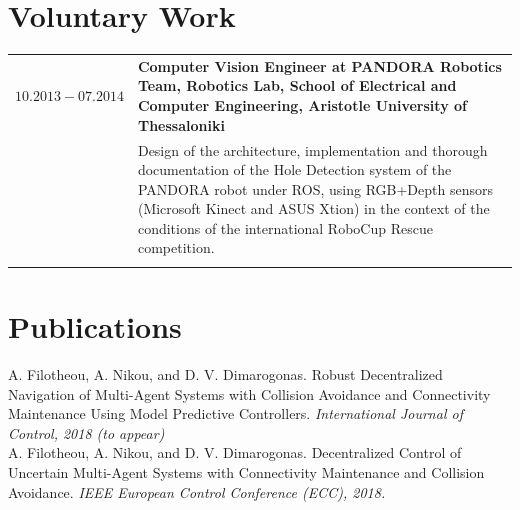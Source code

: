 \documentclass[a4paper,10pt,twoside]{article}
\begin{document}
\section{Voluntary Work}


\begin{tabular}{rp{11cm}}
$10.2013 -07.2014$ & \textbf{Computer Vision Engineer at PANDORA Robotics Team, Robotics Lab,
School of Electrical and Computer Engineering, Aristotle University of Thessaloniki} \\
& \small{Design of the architecture, implementation and thorough documentation of
the Hole Detection system of the PANDORA robot under ROS, using RGB+Depth sensors
(Microsoft Kinect and ASUS Xtion) in the context of the conditions of the international
RoboCup Rescue competition.}\\
\multicolumn{2}{c}{} \\
\end{tabular}


\section{Publications}

A. Filotheou, A. Nikou, and D. V. Dimarogonas. Robust Decentralized Navigation
of Multi-Agent Systems with Collision Avoidance and Connectivity Maintenance
Using Model Predictive Controllers. \textit{International Journal of Control, 2018 (to appear)}\\

A. Filotheou, A. Nikou, and D. V. Dimarogonas. Decentralized Control of Uncertain
Multi-Agent Systems with Connectivity Maintenance and Collision Avoidance.
\textit{IEEE European Control Conference (ECC), 2018.}\\




\end{document}
